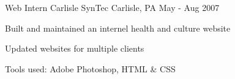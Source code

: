 \begin{cventries}
  \cventry
    {Web Intern}
    {Carlisle SynTec}
    {Carlisle, PA}
    {May - Aug 2007}
    {
      \begin{cvitems}
        \item {Built and maintained an internel health and culture website}
        \item {Updated websites for multiple clients}
        \item {Tools used: Adobe Photoshop, HTML \& CSS}
      \end{cvitems}
    }
\end{cventries}
